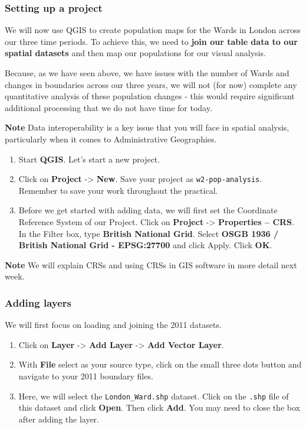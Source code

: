 \documentclass[
]{book}
\providecommand{\tightlist}{%
  \setlength{\itemsep}{0pt}\setlength{\parskip}{0pt}}
\begin{document}
\hypertarget{setting-up-a-project}{%
\subsubsection{Setting up a project}\label{setting-up-a-project}}

We will now use QGIS to create population maps for the Wards in London across our three time periods. To achieve this, we need to \textbf{join our table data to our spatial datasets} and then map our populations for our visual analysis.

Because, as we have seen above, we have issues with the number of Wards and changes in boundaries across our three years, we will not (for now) complete any quantitative analysis of these population changes - this would require significant additional processing that we do not have time for today.

\textbf{Note}
Data interoperability is a key issue that you will face in spatial analysis, particularly when it comes to Administrative Geographies.

\begin{enumerate}
\def\labelenumi{\arabic{enumi}.}
\tightlist
\item
  Start \textbf{QGIS}.
  Let's start a new project.
\item
  Click on \textbf{Project} -\textgreater{} \textbf{New}. Save your project as \texttt{w2-pop-analysis}. Remember to save your work throughout the practical.
\item
  Before we get started with adding data, we will first set the Coordinate Reference System of our Project. Click on \textbf{Project} -\textgreater{} \textbf{Properties -- CRS}. In the Filter box, type \textbf{British National Grid}. Select \textbf{OSGB 1936 / British National Grid - EPSG:27700} and click Apply. Click \textbf{OK}.
\end{enumerate}

\textbf{Note}
We will explain CRSs and using CRSs in GIS software in more detail next week.

\hypertarget{adding-layers}{%
\subsubsection{Adding layers}\label{adding-layers}}

We will first focus on loading and joining the 2011 datasets.

\begin{enumerate}
\def\labelenumi{\arabic{enumi}.}
\item
  Click on \textbf{Layer} -\textgreater{} \textbf{Add Layer} -\textgreater{} \textbf{Add Vector Layer}.
\item
  With \textbf{File} select as your source type, click on the small three dots button and navigate to your 2011 boundary files.
\item
  Here, we will select the \texttt{London\_Ward.shp} dataset. Click on the \texttt{.shp} file of this dataset and click \textbf{Open}. Then click \textbf{Add}. You may need to close the box after adding the layer.
\end{enumerate}
\end{document}
